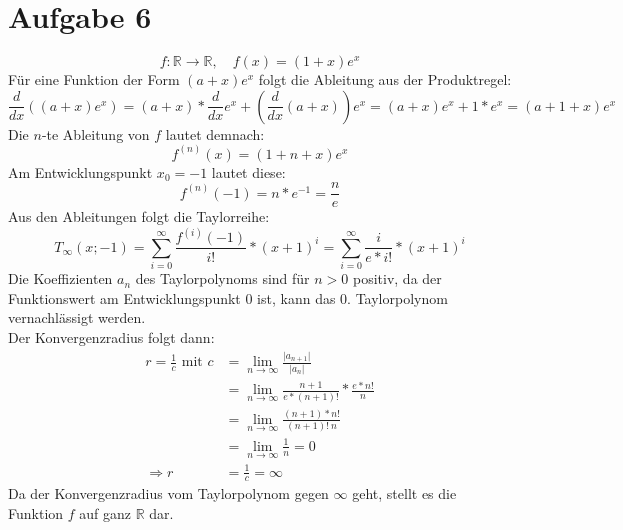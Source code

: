 \documentclass[a4paper]{article}
\begin{document}
\section*{Aufgabe 6}
\[
	f: \mathbb{R} \rightarrow \mathbb{R}, \quad
	f(x) = (1 + x) e^x
\]
Für eine Funktion der Form $(a+x) e^x$ folgt die Ableitung aus der Produktregel:
\[ 
	\frac{d}{dx} \left( (a+x)e^x \right) 
	= (a+x) * \frac{d}{dx} e^x + \left( \frac{d}{dx} (a+x) \right) e^x
	= (a+x) e^x + 1 * e^x 
	= (a+1+x) e^x
\]
Die $n$-te Ableitung von $f$ lautet demnach:
\[
	f^{(n)} (x) = (1+n+x) e^x
\]
Am Entwicklungspunkt $x_0 = -1$ lautet diese:
\[
	f^{(n)} (-1) = n * e^{-1} = \frac n e
\]
Aus den Ableitungen folgt die Taylorreihe:
\[
	T_\infty(x; -1) 
	= \sum_{i=0}^\infty \frac{f^{(i)}(-1)}{i!} * (x+1)^i
	= \sum_{i=0}^\infty \frac{i}{e * i!} * (x+1)^i
\]
Die Koeffizienten $a_n$ des Taylorpolynoms sind für $n > 0$ positiv, 
da der Funktionswert am Entwicklungspunkt 0 ist, kann das 0. Taylorpolynom
vernachlässigt werden.\\
Der Konvergenzradius folgt dann:
\begin{align*}
	r = \frac 1 c \text{ mit } 
	c &= \lim_{n\rightarrow\infty} \frac{\vert a_{n+1} \vert}{\vert a_n \vert} \\
	&= \lim_{n\rightarrow\infty} 
	\frac{n+1}{e * (n+1)!} * \frac{e * n!}{n} \\
	&= \lim_{n\rightarrow\infty}
	\frac{(n+1) * n!}{(n+1)! \ n} \\
	&= \lim_{n\rightarrow\infty}
	\frac1 n = 0 \\
	\Rightarrow
	r &= \frac{1}{c} = \infty
\end{align*}
Da der Konvergenzradius vom Taylorpolynom gegen $\infty$ geht, stellt es die Funktion $f$ 
auf ganz $\mathbb{R}$ dar.
\end{document}
